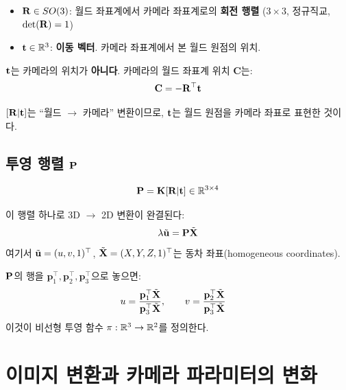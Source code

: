 \documentclass[11pt, a4paper]{report}
\theoremstyle{definition}
\theoremstyle{remark}
\begin{document}
\begin{itemize}[leftmargin=*]
  \item $\mathbf{R} \in SO(3)$: 월드 좌표계에서 카메라 좌표계로의 \textbf{회전 행렬} ($3 \times 3$, 정규직교, $\det(\mathbf{R}) = 1$)
  \item $\mathbf{t} \in \mathbb{R}^3$: \textbf{이동 벡터}. 카메라 좌표계에서 본 월드 원점의 위치.
\end{itemize}

\begin{importantnote}[title={카메라 위치와 $\vt$의 관계}]
$\vt$는 카메라의 위치가 \textbf{아니다}.
카메라의 월드 좌표계 위치 $\mathbf{C}$는:
\begin{equation}
\mathbf{C} = -\mathbf{R}^\top \mathbf{t}
\label{eq:camera_center}
\end{equation}

$[\mathbf{R} | \mathbf{t}]$는 ``월드 $\rightarrow$ 카메라'' 변환이므로, $\vt$는 월드 원점을 카메라 좌표로 표현한 것이다.
\end{importantnote}


\section{투영 행렬 $\mathbf{P}$}

\begin{equation}
\mathbf{P} = \mathbf{K} [\mathbf{R} | \mathbf{t}] \in \mathbb{R}^{3 \times 4}
\label{eq:proj_matrix}
\end{equation}

이 행렬 하나로 3D $\rightarrow$ 2D 변환이 완결된다:
\begin{equation}
\lambda \tilde{\mathbf{u}} = \mathbf{P} \tilde{\mathbf{X}}
\end{equation}
여기서 $\tilde{\mathbf{u}} = (u, v, 1)^\top$, $\tilde{\mathbf{X}} = (X, Y, Z, 1)^\top$는 동차 좌표(homogeneous coordinates).

\begin{proofbox}[title={투영의 전개}]
$\mathbf{P}$의 행을 $\mathbf{p}_1^\top, \mathbf{p}_2^\top, \mathbf{p}_3^\top$으로 놓으면:
\begin{align}
u &= \frac{\mathbf{p}_1^\top \tilde{\mathbf{X}}}{\mathbf{p}_3^\top \tilde{\mathbf{X}}}, \qquad
v = \frac{\mathbf{p}_2^\top \tilde{\mathbf{X}}}{\mathbf{p}_3^\top \tilde{\mathbf{X}}}
\label{eq:proj_explicit}
\end{align}
이것이 비선형 투영 함수 $\pi: \mathbb{R}^3 \rightarrow \mathbb{R}^2$를 정의한다.
\end{proofbox}


\chapter{이미지 변환과 카메라 파라미터의 변화}
\label{ch:transforms}
\end{document}
